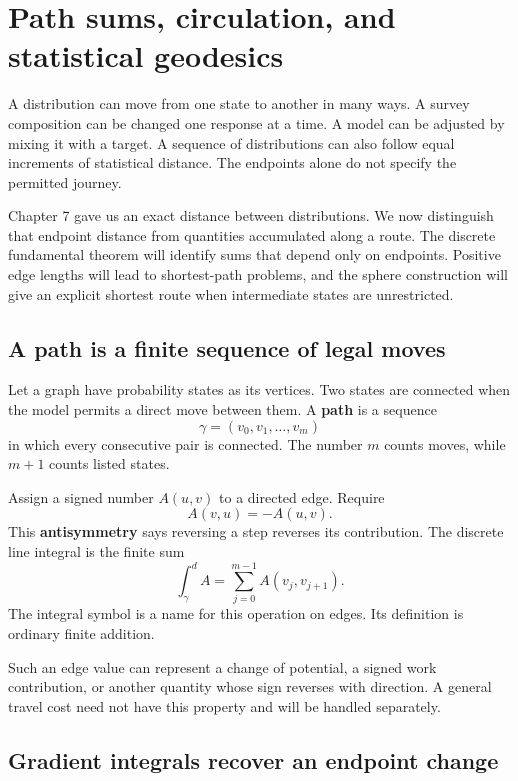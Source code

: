 \documentclass[11pt,oneside,openany]{book}
\theoremstyle{definition}
\theoremstyle{remark}
\numberwithin{equation}{chapter}
\begin{document}
\FloatBarrier

\chapter{Path sums, circulation, and statistical geodesics}
A distribution can move from one state to another in many ways. A survey composition can be changed one response at a time. A model can be adjusted by mixing it with a target. A sequence of distributions can also follow equal increments of statistical distance. The endpoints alone do not specify the permitted journey.

Chapter 7 gave us an exact distance between distributions. We now distinguish that endpoint distance from quantities accumulated along a route. The discrete fundamental theorem will identify sums that depend only on endpoints. Positive edge lengths will lead to shortest-path problems, and the sphere construction will give an explicit shortest route when intermediate states are unrestricted.

\section{A path is a finite sequence of legal moves}\label{ch08-a-path-is-a-finite-sequence-of-legal-moves}

Let a graph have probability states as its vertices. Two states are connected when the model permits a direct move between them. A \textbf{path} is a sequence \[\gamma=(v_0,v_1,\ldots,v_m)\] in which every consecutive pair is connected. The number \(m\) counts moves, while \(m+1\) counts listed states.

Assign a signed number \(A(u,v)\) to a directed edge. Require \[A(v,u)=-A(u,v).\] This \textbf{antisymmetry} says reversing a step reverses its contribution. The discrete line integral is the finite sum \[\boxed{\int_\gamma^d A=\sum_{j=0}^{m-1}A(v_j,v_{j+1}).}\] The integral symbol is a name for this operation on edges. Its definition is ordinary finite addition.

Such an edge value can represent a change of potential, a signed work contribution, or another quantity whose sign reverses with direction. A general travel cost need not have this property and will be handled separately.

\section{Gradient integrals recover an endpoint change}\label{ch08-gradient-integrals-recover-an-endpoint-change}
\end{document}
